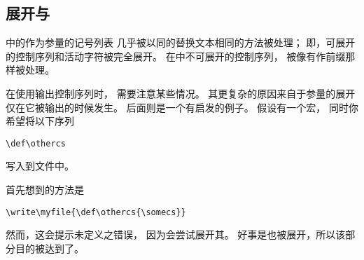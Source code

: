 \documentclass{book}
\begin{document}
\subsection{展开与}
\label{expand:write}

中的作为参量的记号列表
几乎被以同的替换文本相同的方法被处理；
即，可展开的控制序列和活动字符被完全展开。
在中不可展开的控制序列，
被像有作前缀那样被处理。

在使用输出控制序列时，
需要注意某些情况。
其更复杂的原因来自于参量的展开
仅在它被输出的时候发生。
后面则是一个有启发的例子。
假设有一个宏，
同时你希望将以下序列
\begin{disp}\verb-\def\othercs-\rb
\end{disp}
写入到文件中。

首先想到的方法是
\begin{verbatim}
\write\myfile{\def\othercs{\somecs}}
\end{verbatim}
然而，这会提示未定义之错误，
\altt
因为会尝试展开其。
好事是也被展开，所以该部分目的被达到了。
\end{document}

